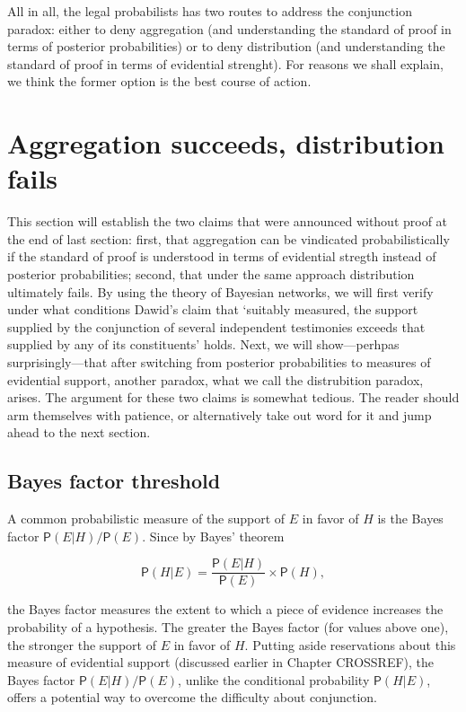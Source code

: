 \documentclass[10pt,dvipsnames,enabledeprecatedfontcommands]{scrartcl}
\newcommand{\pr}[1]{\mathsf{P}(#1)}
\begin{document}
All in all, the legal probabilists has two routes to address the
conjunction paradox: either to deny aggregation (and understanding the
standard of proof in terms of posterior probabilities) or to deny
distribution (and understanding the standard of proof in terms of
evidential strenght). For reasons we shall explain, we think the former
option is the best course of action.

\hypertarget{aggregation-succeeds-distribution-fails}{%
\section{Aggregation succeeds, distribution
fails}\label{aggregation-succeeds-distribution-fails}}

This section will establish the two claims that were announced without
proof at the end of last section: first, that aggregation can be
vindicated probabilistically if the standard of proof is understood in
terms of evidential stregth instead of posterior probabilities; second,
that under the same approach distribution ultimately fails. By using the
theory of Bayesian networks, we will first verify under what conditions
Dawid's claim that `suitably measured, the support supplied by the
conjunction of several independent testimonies exceeds that supplied by
any of its constituents' holds. Next, we will show---perhpas
surprisingly---that after switching from posterior probabilities to
measures of evidential support, another paradox, what we call the
distrubition paradox, arises. The argument for these two claims is
somewhat tedious. The reader should arm themselves with patience, or
alternatively take out word for it and jump ahead to the next section.

\hypertarget{bayes-factor-threshold}{%
\subsection{Bayes factor threshold}\label{bayes-factor-threshold}}

A common probabilistic measure of the support of \(E\) in favor of \(H\)
is the Bayes factor \(\pr{E \vert H}/\pr{E}\). Since by Bayes' theorem

\[\pr{H \vert E} = \frac{\pr{E \vert H}}{\pr{E}}\times \pr{H},\]

\noindent the Bayes factor measures the extent to which a piece of
evidence increases the probability of a hypothesis. The greater the
Bayes factor (for values above one), the stronger the support of \(E\)
in favor of \(H\). Putting aside reservations about this measure of
evidential support (discussed earlier in Chapter CROSSREF), the Bayes
factor \(\pr{E | H}/\pr{E}\), unlike the conditional probability
\(\pr{H | E}\), offers a potential way to overcome the difficulty about
conjunction.
\end{document}
